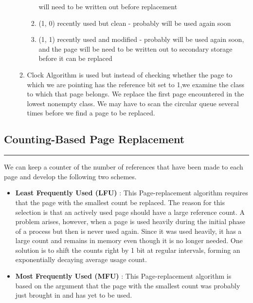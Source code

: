 \documentclass[12pt,onecolumn]{IEEEtran}
\begin{document}
\begin{itemize}
\begin{enumerate}
\begin{enumerate}
			will need to be written out before replacement
			\item (1, 0) recently used but clean - probably will be used again soon
			\item (1, 1) recently used and modified - probably will be used again soon, and
			the page will be need to be written out to secondary storage before it can
			be replaced
		\end{enumerate}
		\item Clock Algorithm is used but instead of checking whether the page to which we are pointing has the reference bit set to 1,we examine the class to which that page belongs. We replace the first page
		encountered in the lowest nonempty class. We may have to scan the
		circular queue several times before we find a page to be replaced. 
	\end{enumerate}
\end{itemize}
\subsection{Counting-Based Page Replacement}
\hrule
\vspace{3mm}
We can keep a counter of the number of references that have been
made to each page and develop the following two schemes.

\begin{itemize}
	\item \textbf{Least Frequently Used (LFU)} : This Page-replacement algorithm requires that
	the page with the smallest count be replaced. The reason for this selection is
	that an actively used page should have a large reference count. A problem
	arises, however, when a page is used heavily during the initial phase of
	a process but then is never used again. Since it was used heavily, it has
	a large count and remains in memory even though it is no longer needed.
	One solution is to shift the counts right by 1 bit at regular intervals, forming
	an exponentially decaying average usage count.
	\item \textbf{Most Frequently Used (MFU)} : This Page-replacement algorithm is based
	on the argument that the page with the smallest count was probably just
	brought in and has yet to be used.
\end{itemize}
\end{document}
